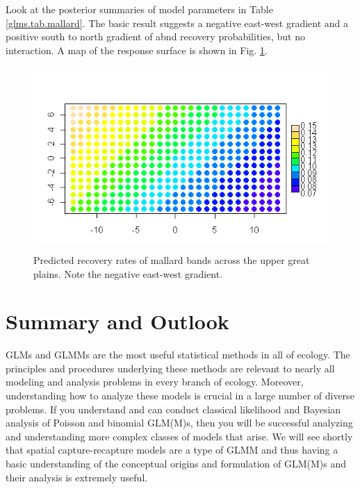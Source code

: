 

Look at the posterior summaries of model parameters in Table \ref{glms.tab.mallard}. The basic result suggests a negative east-west gradient and a positive
south to north gradient of abnd recovery probabilities, but no interaction. A map of the response
surface is shown in Fig. \ref{glms.fig.bandrecovery}.


\begin{figure}
\begin{center}
\includegraphics[height=2.75in]{Ch2-Bayes/figs/responsesurface}
\end{center}
\caption{Predicted recovery rates of mallard bands across the upper great plains. Note the negative east-west gradient.}
\label{glms.fig.bandrecovery}
\end{figure}

\section{ Summary and Outlook}

GLMs and GLMMs are the most useful statistical methods in all of
ecology. The principles and procedures underlying these methods are
relevant to nearly all modeling and analysis problems in every branch
of ecology. Moreover, understanding how to analyze these models is
crucial in a large number of diverse problems. If you understand and
can conduct classical likelihood and Bayesian analysis of Poisson and
binomial GLM(M)s, then you will be successful analyzing and
understanding more complex classes of models that arise. We will see
shortly that spatial capture-recapture models are a type of GLMM
and thus having a basic
understanding of the conceptual origins and formulation of GLM(M)s and
their analysis is extremely useful.

